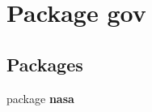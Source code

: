 \section{Package gov}
\label{namespacegov}
\subsection*{Packages}
\begin{DoxyCompactItemize}
\item 
package {\bf nasa}
\end{DoxyCompactItemize}
